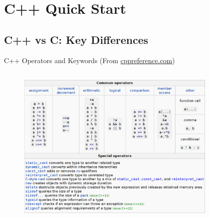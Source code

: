 \section{C++ Quick Start}

\subsection{C++ vs C: Key Differences}

\begin{frame}[fragile]{C++ Operators and Keywords (From \textcolor{blue}{\href{https://en.cppreference.com/w/cpp/language/}{cppreference.com}})}
    \begin{columns}
        \begin{column}{0.6\textwidth}
    \begin{figure}
        \includegraphics[width=\textwidth]{day8_pm/img/1-operators}
    \end{figure}
        \end{column}
        \begin{column}{0.4\textwidth}
            \begin{figure}

\end{figure}
\end{column}
\end{columns}
\end{frame}
